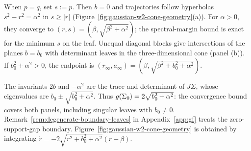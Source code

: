 When $p=q$, set $s:=p$. Then $b=0$ and trajectories follow hyperbolas
$s^2-r^2=\alpha^2$ in $s\ge|r|$ (Figure~\ref{fig:gaussian-w2-cone-geometry}(a)).
For $\alpha>0$, they converge to $(r,s)=(\beta,\sqrt{\beta^2+\alpha^2})$;
the spectral-margin bound is exact for the minimum $s$ on the leaf.
Unequal diagonal blocks give intersections of the planes $b=b_0$ with
determinant leaves in the three-dimensional cone (panel (b)).
If $b_0^2+\alpha^2>0$, the endpoint is
$(r_\infty,a_\infty)=(\beta,\sqrt{\beta^2+b_0^2+\alpha^2})$.

The invariants $2b$ and $-\alpha^2$ are the trace and determinant of
$J\Sigma$, whose eigenvalues are $b_0\pm\sqrt{b_0^2+\alpha^2}$.
Thus $g(\Sigma_0)=2\sqrt{b_0^2+\alpha^2}$: the convergence bound
covers both panels, including singular leaves with $b_0\ne0$.
Remark~\ref{rem:degenerate-boundary-leaves} in Appendix~\ref{app:gf}
treats the zero-support-gap boundary. Figure~\ref{fig:gaussian-w2-cone-geometry}
is obtained by integrating $\dot r=-2\sqrt{r^2+b_0^2+\alpha^2}(r-\beta)$.

